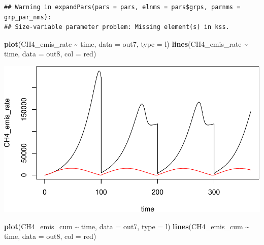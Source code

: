 \documentclass[
]{article}
\newenvironment{Shaded}{\begin{snugshade}}{\end{snugshade}}
\newcommand{\AttributeTok}[1]{\textcolor[rgb]{0.13,0.29,0.53}{#1}}
\newcommand{\FunctionTok}[1]{\textcolor[rgb]{0.13,0.29,0.53}{\textbf{#1}}}
\newcommand{\NormalTok}[1]{#1}
\newcommand{\SpecialCharTok}[1]{\textcolor[rgb]{0.81,0.36,0.00}{\textbf{#1}}}
\newcommand{\StringTok}[1]{\textcolor[rgb]{0.31,0.60,0.02}{#1}}
\begin{document}
\begin{verbatim}
## Warning in expandPars(pars = pars, elnms = pars$grps, parnms = grp_par_nms):
## Size-variable parameter problem: Missing element(s) in kss.
\end{verbatim}

\begin{Shaded}
\begin{Highlighting}[]
\FunctionTok{plot}\NormalTok{(CH4\_emis\_rate }\SpecialCharTok{\textasciitilde{}}\NormalTok{ time, }\AttributeTok{data =}\NormalTok{ out7, }\AttributeTok{type =} \StringTok{\textquotesingle{}l\textquotesingle{}}\NormalTok{)}
\FunctionTok{lines}\NormalTok{(CH4\_emis\_rate }\SpecialCharTok{\textasciitilde{}}\NormalTok{ time, }\AttributeTok{data =}\NormalTok{ out8, }\AttributeTok{col =} \StringTok{\textquotesingle{}red\textquotesingle{}}\NormalTok{)}
\end{Highlighting}
\end{Shaded}

\includegraphics{simple_demo_files/figure-latex/unnamed-chunk-59-1.pdf}

\begin{Shaded}
\begin{Highlighting}[]
\FunctionTok{plot}\NormalTok{(CH4\_emis\_cum }\SpecialCharTok{\textasciitilde{}}\NormalTok{ time, }\AttributeTok{data =}\NormalTok{ out7, }\AttributeTok{type =} \StringTok{\textquotesingle{}l\textquotesingle{}}\NormalTok{)}
\FunctionTok{lines}\NormalTok{(CH4\_emis\_cum }\SpecialCharTok{\textasciitilde{}}\NormalTok{ time, }\AttributeTok{data =}\NormalTok{ out8, }\AttributeTok{col =} \StringTok{\textquotesingle{}red\textquotesingle{}}\NormalTok{)}
\end{Highlighting}
\end{Shaded}
\end{document}

